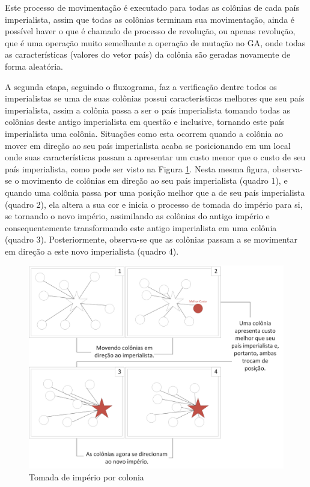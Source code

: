 Este processo de movimentação é executado para todas as colônias de cada país imperialista, assim que todas as colônias terminam sua movimentação, ainda é possível haver o que é chamado de processo de revolução, ou apenas revolução, que é uma operação muito semelhante a operação de mutação no GA, onde todas as características (valores do vetor país) da colônia são geradas novamente de forma aleatória.

A segunda etapa, seguindo o fluxograma, faz a verificação dentre todos os imperialistas se uma de suas colônias possui características melhores que seu país imperialista, assim a colônia passa a ser o país imperialista tomando todas as colônias deste antigo imperialista em questão e inclusive, tornando este país imperialista uma colônia. Situações como esta ocorrem quando a colônia ao mover em direção ao seu país imperialista acaba se posicionando em um local onde suas características passam a apresentar um custo menor que o custo de seu país imperialista, como pode ser visto na Figura \ref{fig:Ilustrations-ColonialRevolution}. Nesta mesma figura, observa-se o movimento de colônias em direção ao seu país imperialista (quadro 1), e quando uma colônia passa por uma posição melhor que a de seu país imperialista (quadro 2), ela altera a sua cor e inicia o processo de tomada do império para si, se tornando o novo império, assimilando as colônias do antigo império e consequentemente transformando este antigo imperialista em uma colônia (quadro 3). Posteriormente, observa-se que as colônias passam a se movimentar em direção a este novo imperialista (quadro 4).

\begin{figure}[h]
	\centering	
	\includegraphics[scale=0.5]{Figuras/Ilustrations-ColonialRevolution.png}
	\caption{Tomada de império por colonia}
	\label{fig:Ilustrations-ColonialRevolution}
\end{figure}

